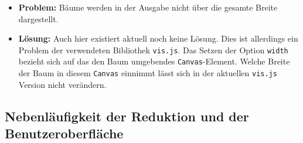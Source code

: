 \documentclass[parskip=full,11pt]{scrartcl}
\begin{document}
\begin{itemize}
\item[] \textbf{Problem:} Bäume werden in der Ausgabe nicht über die gesamte Breite dargestellt.
\item[] \textbf{Lösung:} Auch hier existiert aktuell noch keine Lösung. Dies ist allerdings ein Problem der verwendeten Bibliothek \texttt{vis.js}. Das Setzen der Option \texttt{width} bezieht sich auf das den Baum umgebendes \texttt{Canvas}-Element. Welche Breite der Baum in diesem \texttt{Canvas} einnimmt lässt sich in der aktuellen \texttt{vis.js} Version nicht verändern.
\end{itemize}

\subsection{Nebenläufigkeit der Reduktion und der Benutzeroberfläche}
\end{document}
